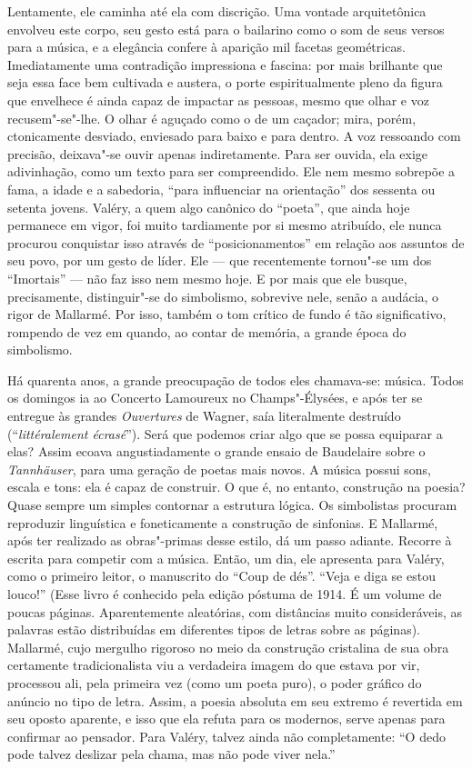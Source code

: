 Lentamente, ele caminha até ela com discrição. Uma vontade
arquitetônica envolveu este corpo, seu gesto está para o bailarino como
o som de seus versos para a música, e a elegância confere à aparição mil
facetas geométricas. Imediatamente uma contradição impressiona e
fascina: por mais brilhante que seja essa face bem cultivada e austera,
o porte espiritualmente pleno da figura que envelhece é ainda capaz de
impactar as pessoas, mesmo que olhar e voz recusem"-se"-lhe. O olhar é
aguçado como o de um caçador; mira, porém, ctonicamente desviado, enviesado
para baixo e para dentro. A voz ressoando com precisão, deixava"-se ouvir apenas
indiretamente. Para ser ouvida, ela exige adivinhação, como um texto
para ser compreendido. Ele nem mesmo sobrepõe a fama, a idade e a sabedoria,
``para influenciar na orientação'' dos sessenta ou setenta jovens.
Valéry, a quem algo canônico do ``poeta'', que ainda hoje permanece em
vigor, foi muito tardiamente por si mesmo atribuído, ele nunca
procurou conquistar isso através de ``posicionamentos'' em relação aos
assuntos de seu povo, por um gesto de líder. Ele --- que recentemente
tornou"-se um dos ``Imortais'' --- não faz isso nem mesmo hoje. E por mais
que ele busque, precisamente, distinguir"-se do simbolismo, sobrevive nele, senão a audácia, o rigor de
Mallarmé. Por isso, também o
tom crítico de fundo é tão significativo, rompendo de vez em quando, ao
contar de memória, a grande época do simbolismo.

Há quarenta anos, a grande preocupação de todos eles chamava-se: música.
Todos os domingos ia ao Concerto Lamoureux no Champs"-Élysées, e após ter se entregue às 
grandes \emph{Ouvertures} de Wagner, saía literalmente destruído (``\emph{littéralement %
écrasé}''). Será que podemos criar algo que se possa equiparar
a elas? Assim ecoava angustiadamente o grande ensaio de Baudelaire
sobre o \emph{Tannhäuser}, para uma geração de poetas mais novos. A música possui
sons, escala e tons: ela é capaz de construir. O que é, no entanto,
construção na poesia? Quase sempre um simples contornar a estrutura
lógica. Os simbolistas procuram reproduzir linguística e foneticamente a
construção de sinfonias. E Mallarmé, após ter realizado as obras"-primas
desse estilo, dá um passo adiante. Recorre à
escrita para competir com a música. Então, um dia, ele apresenta para
Valéry, como o primeiro leitor, o manuscrito do ``Coup de dés''. ``Veja
e diga se estou louco!'' (Esse livro é conhecido pela edição póstuma de
1914. É um volume de poucas páginas. Aparentemente aleatórias,
com distâncias muito consideráveis, as palavras estão distribuídas em
diferentes tipos de letras sobre as páginas). Mallarmé, cujo mergulho
rigoroso no meio da construção cristalina de sua obra certamente
tradicionalista viu a verdadeira imagem do que estava por vir, processou
ali, pela primeira vez (como um poeta puro), o poder gráfico do anúncio
no tipo de letra. Assim, a poesia absoluta em seu extremo é revertida em seu oposto
aparente, e isso que ela refuta para os modernos, serve apenas para confirmar ao pensador. Para Valéry, talvez ainda não completamente: ``O dedo
pode talvez deslizar pela chama, mas não pode viver nela.''
